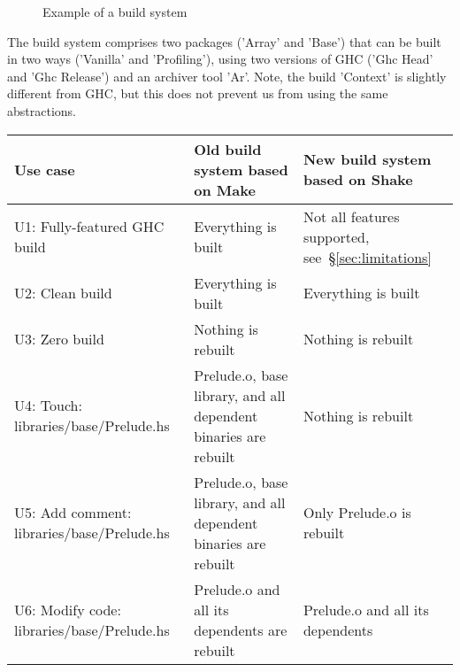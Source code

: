 \begin{figure}
\caption{Example of a build system\label{fig:example-abstractions}}
\end{figure}

The build system comprises two packages (\lst'Array' and \lst'Base') that can
be built in two ways (\lst'Vanilla' and \lst'Profiling'), using two versions
of GHC (\lst'Ghc Head' and \lst'Ghc Release') and an archiver tool \lst'Ar'.
Note, the build \lst'Context' is slightly different from GHC, but this does not
prevent us from using the same abstractions.

\newcommand{\checkedbox}{\makebox[0pt][l]{$\square$}\raisebox{.15ex}{\hspace{0.1em}$\checkmark$}}
\newcommand{\uncheckedbox}{\makebox[0pt][l]{$\square$}\raisebox{.15ex}{\hspace{0.92em}}}
\begin{table*}[t]
\centering
\begin{tabular}{p{60mm} || p{50mm} | p{50mm}}
\textbf{Use case}
& \textbf{Old build system} based on Make
& \textbf{New build system} based on Shake
\\
\hline
\textsf{U1:} Fully-featured GHC build
& Everything is built \hfill \checkedbox
& Not all features supported, see~\S\ref{sec:limitations} \hfill \uncheckedbox
\\
\textsf{U2:} Clean build
& Everything is built \hfill \checkedbox
& Everything is built \hfill \checkedbox
\\
\textsf{U3:} Zero build \hspace{6.4mm}
& Nothing is rebuilt \hfill \checkedbox
& Nothing is rebuilt \hfill \checkedbox
\\
\hline
\textsf{U4:} Touch: \hspace{10.2mm}\textsf{libraries/base/Prelude.hs}
& \textsf{Prelude.o}, \textsf{base} library, and all \hfill \uncheckedbox
\newline dependent binaries are rebuilt
& Nothing is rebuilt \hfill \checkedbox
\\
\textsf{U5:} Add comment: \textsf{libraries/base/Prelude.hs}
& \textsf{Prelude.o}, \textsf{base} library, and all \hfill \uncheckedbox
\newline dependent binaries are rebuilt
& Only \textsf{Prelude.o} is rebuilt \hfill \checkedbox
\\
\textsf{U6:} Modify code: \hspace{1.75mm}\textsf{libraries/base/Prelude.hs}
& \textsf{Prelude.o} and all its dependents \hfill \checkedbox \newline
are rebuilt
& \textsf{Prelude.o} and all its dependents \hfill \checkedbox \newline

\end{tabular}
\end{table*}
